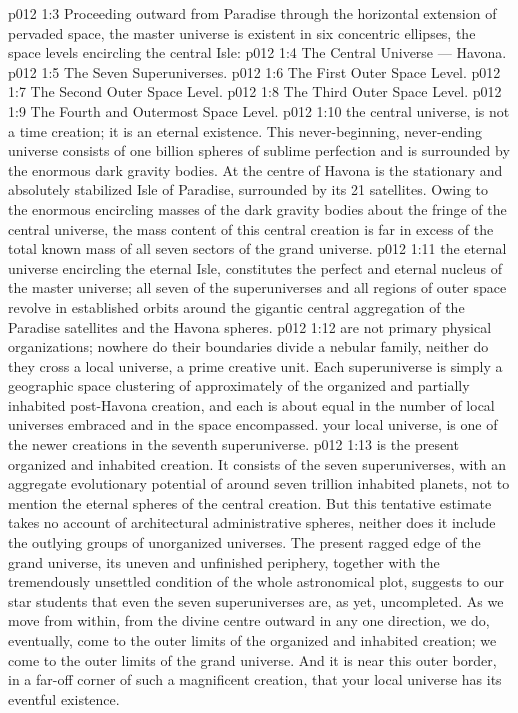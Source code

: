 \vs p012 1:3 \pc Proceeding outward from Paradise through the horizontal extension of pervaded space, the master universe is existent in six concentric ellipses, the space levels encircling the central Isle:
\vs p012 1:4 \bibnobreakspace The Central Universe --- Havona.
\vs p012 1:5 \bibnobreakspace The Seven Superuniverses.
\vs p012 1:6 \bibnobreakspace The First Outer Space Level.
\vs p012 1:7 \bibnobreakspace The Second Outer Space Level.
\vs p012 1:8 \bibnobreakspace The Third Outer Space Level.
\vs p012 1:9 \bibnobreakspace The Fourth and Outermost Space Level.
\vs p012 1:10 \pc {} the central universe, is not a time creation; it is an eternal existence. This never\hyp{}beginning, never\hyp{}ending universe consists of one billion spheres of sublime perfection and is surrounded by the enormous dark gravity bodies. At the centre of Havona is the stationary and absolutely stabilized Isle of Paradise, surrounded by its 21 satellites. Owing to the enormous encircling masses of the dark gravity bodies about the fringe of the central universe, the mass content of this central creation is far in excess of the total known mass of all seven sectors of the grand universe.
\vs p012 1:11 \pc {} the eternal universe encircling the eternal Isle, constitutes the perfect and eternal nucleus of the master universe; all seven of the superuniverses and all regions of outer space revolve in established orbits around the gigantic central aggregation of the Paradise satellites and the Havona spheres.
\vs p012 1:12  are not primary physical organizations; nowhere do their boundaries divide a nebular family, neither do they cross a local universe, a prime creative unit. Each superuniverse is simply a geographic space clustering of approximately  of the organized and partially inhabited post\hyp{}Havona creation, and each is about equal in the number of local universes embraced and in the space encompassed.  your local universe, is one of the newer creations in  the seventh superuniverse.
\vs p012 1:13  is the present organized and inhabited creation. It consists of the seven superuniverses, with an aggregate evolutionary potential of around seven trillion inhabited planets, not to mention the eternal spheres of the central creation. But this tentative estimate takes no account of architectural administrative spheres, neither does it include the outlying groups of unorganized universes. The present ragged edge of the grand universe, its uneven and unfinished periphery, together with the tremendously unsettled condition of the whole astronomical plot, suggests to our star students that even the seven superuniverses are, as yet, uncompleted. As we move from within, from the divine centre outward in any one direction, we do, eventually, come to the outer limits of the organized and inhabited creation; we come to the outer limits of the grand universe. And it is near this outer border, in a far\hyp{}off corner of such a magnificent creation, that your local universe has its eventful existence.
